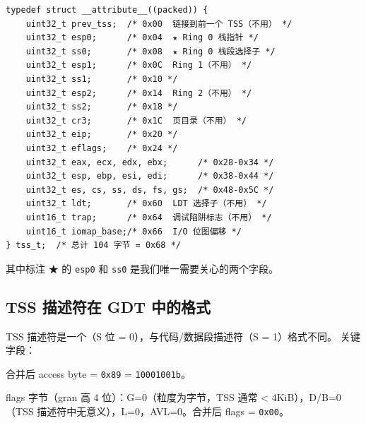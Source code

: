 \begin{lstlisting}[style=cstyle]
typedef struct __attribute__((packed)) {
    uint32_t prev_tss;  /* 0x00  链接到前一个 TSS（不用） */
    uint32_t esp0;      /* 0x04  ★ Ring 0 栈指针 */
    uint32_t ss0;       /* 0x08  ★ Ring 0 栈段选择子 */
    uint32_t esp1;      /* 0x0C  Ring 1（不用） */
    uint32_t ss1;       /* 0x10 */
    uint32_t esp2;      /* 0x14  Ring 2（不用） */
    uint32_t ss2;       /* 0x18 */
    uint32_t cr3;       /* 0x1C  页目录（不用） */
    uint32_t eip;       /* 0x20 */
    uint32_t eflags;    /* 0x24 */
    uint32_t eax, ecx, edx, ebx;      /* 0x28-0x34 */
    uint32_t esp, ebp, esi, edi;      /* 0x38-0x44 */
    uint32_t es, cs, ss, ds, fs, gs;  /* 0x48-0x5C */
    uint32_t ldt;       /* 0x60  LDT 选择子（不用） */
    uint16_t trap;      /* 0x64  调试陷阱标志（不用） */
    uint16_t iomap_base;/* 0x66  I/O 位图偏移 */
} tss_t;  /* 总计 104 字节 = 0x68 */
\end{lstlisting}

其中标注 ★ 的 \texttt{esp0} 和 \texttt{ss0} 是我们唯一需要关心的两个字段。



\subsection{TSS 描述符在 GDT 中的格式}
\label{sec:tss-gdt-descriptor}

TSS 描述符是一个（S 位 = 0），与代码/数据段描述符（S = 1）格式不同。
关键字段：

\begin{bitfield}
\end{bitfield}

\noindent 合并后 access byte = \texttt{0x89} = \texttt{10001001b}。

flags 字节（gran 高 4 位）：G=0（粒度为字节，TSS 通常 < 4KiB），D/B=0（TSS 描述符中无意义），L=0，AVL=0。合并后 flags = \texttt{0x00}。
